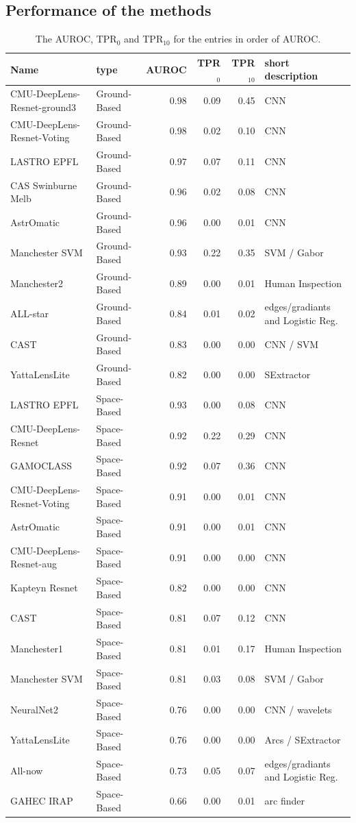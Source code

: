 \documentclass{aa}
\begin{document}
\subsection{Performance of the methods}
\label{sec:performance}

\begin{table}
\centering
\begin{tabular}{llrrrl}
  \hline
  Name & type & AUROC & TPR$_0$ & TPR$_{10}$ & short description \\ 
  \hline
 CMU-DeepLens-Resnet-ground3 & Ground-Based & 0.98 & 0.09 & 0.45 & CNN \\ 
  CMU-DeepLens-Resnet-Voting & Ground-Based & 0.98 & 0.02 & 0.10 & CNN \\ 
  LASTRO EPFL & Ground-Based & 0.97 & 0.07 & 0.11 & CNN \\ 
  CAS Swinburne Melb & Ground-Based & 0.96 & 0.02 & 0.08 & CNN \\ 
  AstrOmatic & Ground-Based & 0.96 & 0.00 & 0.01 & CNN \\ 
  Manchester SVM & Ground-Based & 0.93 & 0.22 & 0.35 & SVM / Gabor \\ 
  Manchester2 & Ground-Based & 0.89 & 0.00 & 0.01 & Human Inspection \\ 
   ALL-star & Ground-Based & 0.84 & 0.01 & 0.02 & edges/gradiants and Logistic Reg. \\ 
   CAST & Ground-Based & 0.83 & 0.00 & 0.00 & CNN / SVM \\ 
   YattaLensLite & Ground-Based & 0.82 & 0.00 & 0.00 & SExtractor \\ 
   LASTRO EPFL & Space-Based & 0.93 & 0.00 & 0.08 & CNN \\ 
  CMU-DeepLens-Resnet & Space-Based & 0.92 & 0.22 & 0.29 & CNN \\ 
   GAMOCLASS & Space-Based & 0.92 & 0.07 & 0.36 & CNN \\ 
  CMU-DeepLens-Resnet-Voting & Space-Based & 0.91 & 0.00 & 0.01 & CNN \\ 
  AstrOmatic & Space-Based & 0.91 & 0.00 & 0.01 & CNN \\ 
   CMU-DeepLens-Resnet-aug & Space-Based & 0.91 & 0.00 & 0.00 & CNN \\ 
   Kapteyn Resnet & Space-Based & 0.82 & 0.00 & 0.00 & CNN \\ 
   CAST & Space-Based & 0.81 & 0.07 & 0.12 & CNN \\ 
  Manchester1 & Space-Based & 0.81 & 0.01 & 0.17 & Human Inspection \\ 
   Manchester SVM & Space-Based & 0.81 & 0.03 & 0.08 & SVM / Gabor \\ 
   NeuralNet2 & Space-Based & 0.76 & 0.00 & 0.00 & CNN / wavelets \\ 
   YattaLensLite & Space-Based & 0.76 & 0.00 & 0.00 & Arcs / SExtractor \\ 
   All-now & Space-Based & 0.73 & 0.05 & 0.07 & edges/gradiants and Logistic Reg. \\ 
  GAHEC IRAP & Space-Based & 0.66 & 0.00 & 0.01 & arc finder \\ 
   \hline
\end{tabular}
\caption{The AUROC, TPR$_0$ and TPR$_{10}$ for the entries in order of AUROC.}
\label{table:AUROC}
\end{table}
\end{document}
